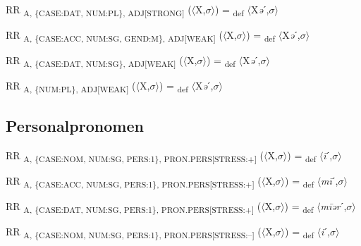 {\begin{exe}
 RR \textsubscript{A, \{CASE:DAT, NUM:PL\}, ADJ[STRONG]} ($\langle$X,$\sigma $$\rangle$) = \textsubscript{def} $\langle$X\textit{ə}ˊ,$\sigma $$\rangle$
\end{exe}

\begin{exe}
 RR \textsubscript{A, \{CASE:ACC, NUM:SG, GEND:M\}, ADJ[WEAK]} ($\langle$X,$\sigma $$\rangle$) = \textsubscript{def} $\langle$X\textit{ə}ˊ,$\sigma $$\rangle$
\end{exe}

\begin{exe}
 RR \textsubscript{A, \{CASE:DAT, NUM:SG\}, ADJ[WEAK]} ($\langle$X,$\sigma $$\rangle$) = \textsubscript{def} $\langle$X\textit{ə}ˊ,$\sigma $$\rangle$
\end{exe}

\begin{exe}
 RR \textsubscript{A, \{NUM:PL\}, ADJ[WEAK]} ($\langle$X,$\sigma $$\rangle$) = \textsubscript{def} $\langle$X\textit{ə}ˊ,$\sigma $$\rangle$
\end{exe}

\subsection{Personalpronomen}

\begin{exe}
 RR \textsubscript{A, \{CASE:NOM, NUM:SG, PERS:1\}, PRON.PERS[STRESS:+]} ($\langle$X,$\sigma $$\rangle$) = \textsubscript{def} $\langle$\textit{\=i}ˊ,$\sigma $$\rangle$
\end{exe}

\begin{exe}
 RR \textsubscript{A, \{CASE:ACC, NUM:SG, PERS:1\}, PRON.PERS[STRESS:+]} ($\langle$X,$\sigma $$\rangle$) = \textsubscript{def} $\langle$\textit{m\=i}ˊ,$\sigma $$\rangle$
\end{exe}

\begin{exe}
 RR \textsubscript{A, \{CASE:DAT, NUM:SG, PERS:1\}, PRON.PERS[STRESS:+]} ($\langle$X,$\sigma $$\rangle$) = \textsubscript{def} $\langle$\textit{m\=iər}ˊ,$\sigma $$\rangle$
\end{exe}

\begin{exe}
 RR \textsubscript{A, \{CASE:NOM, NUM:SG, PERS:1\}, PRON.PERS[STRESS:–]} ($\langle$X,$\sigma $$\rangle$) = \textsubscript{def} $\langle$\textit{i}ˊ,$\sigma $$\rangle$
\end{exe}

}
